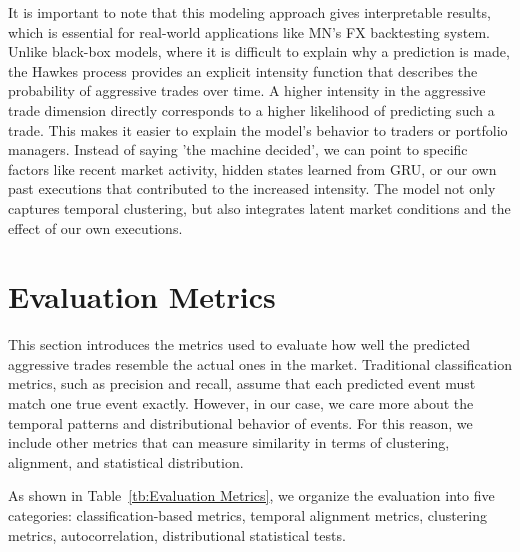 It is important to note that this modeling approach gives interpretable results, which is essential for real-world applications like MN's FX backtesting system. Unlike black-box models, where it is difficult to explain why a prediction is made, the Hawkes process provides an explicit intensity function that describes the probability of aggressive trades over time. A higher intensity in the aggressive trade dimension directly corresponds to a higher likelihood of predicting such a trade. This makes it easier to explain the model's behavior to traders or portfolio managers. Instead of saying 'the machine decided', we can point to specific factors like recent market activity, hidden states learned from GRU, or our own past executions that contributed to the increased intensity. The model not only captures temporal clustering, but also integrates latent market conditions and the effect of our own executions.




\section{Evaluation Metrics}
This section introduces the metrics used to evaluate how well the predicted aggressive trades resemble the actual ones in the market. Traditional classification metrics, such as precision and recall, assume that each predicted event must match one true event exactly. However, in our case, we care more about the temporal patterns and distributional behavior of events. For this reason, we include other metrics that can measure similarity in terms of clustering, alignment, and statistical distribution.

As shown in Table~\ref{tb:Evaluation Metrics}, we organize the evaluation into five categories: classification-based metrics, temporal alignment metrics, clustering metrics, autocorrelation, distributional statistical tests.

